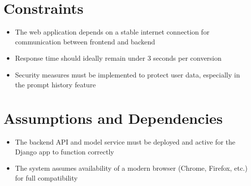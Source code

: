 \section{Constraints}
\begin{itemize}
    \item The web application depends on a stable internet connection for communication between frontend and backend
    \item Response time should ideally remain under 3 seconds per conversion
    \item Security measures must be implemented to protect user data, especially in the prompt history feature
\end{itemize}


\section{Assumptions and Dependencies}
\begin{itemize}
    \item The backend API and model service must be deployed and active for the Django app to function correctly
    \item The system assumes availability of a modern browser (Chrome, Firefox, etc.) for full compatibility
\end{itemize}

















